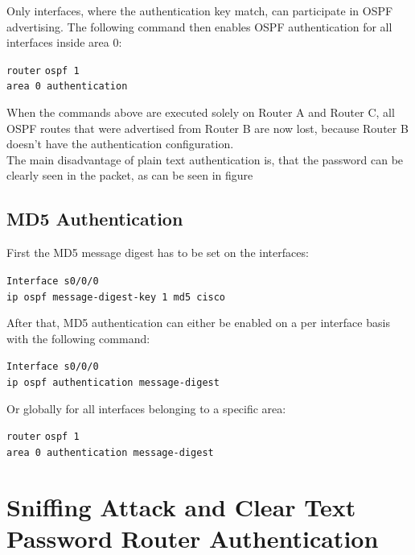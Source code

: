 Only interfaces, where the authentication key match, can participate in OSPF advertising.
The following command then enables OSPF authentication for all interfaces inside area 0:

\begin{tabbing}
\texttt{router} \= \texttt{ospf 1} \\
\> \texttt{area 0 authentication}
\end{tabbing}

When the commands above are executed solely on Router A and Router C, all OSPF routes that were advertised from Router B are now lost, because Router B doesn't have the authentication configuration. \\
The main disadvantage of plain text authentication is, that the password can be clearly seen in the packet, as can be seen in figure %

\pagebreak
\section{MD5 Authentication}

First the MD5 message digest has to be set on the interfaces:
\begin{tabbing}
\texttt{Interf}\= \texttt{ace s0/0/0} \\
\> \texttt{ip ospf message-digest-key 1 md5 cisco}
\end{tabbing}

After that, MD5 authentication can either be enabled on a per interface basis with the following command:
\begin{tabbing}
\texttt{Interf}\= \texttt{ace s0/0/0} \\
\> \texttt{ip ospf authentication message-digest}
\end{tabbing}
   
Or globally for all interfaces belonging to a specific area:
\begin{tabbing}
\texttt{router} \= \texttt{ospf 1} \\
\> \texttt{area 0 authentication message-digest}
\end{tabbing}

\chapter{Sniffing Attack and Clear Text Password Router Authentication}